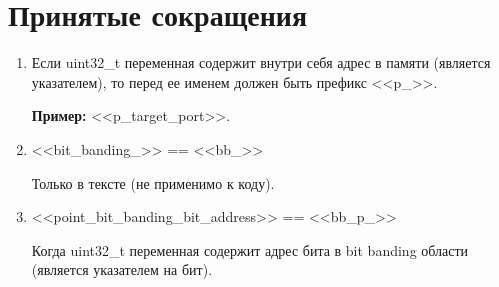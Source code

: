 \chapter{Принятые сокращения}\label{sk:0}
\begin{enumerate}
	\item Если uint32\_t переменная содержит внутри себя адрес в памяти (является указателем), то перед ее именем должен быть префикс <<p\_>>.
	
	\textbf{Пример:} <<p\_target\_port>>.
	\item <<bit\_banding\_>> == <<bb\_>>
	
	Только в тексте (не применимо к коду).
	\item <<point\_bit\_banding\_bit\_address>> == <<bb\_p\_>>
	
	Когда uint32\_t переменная содержит адрес бита в bit banding области (является указателем на бит).
\end{enumerate}